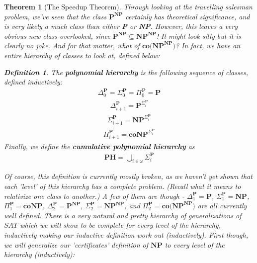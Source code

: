 \documentclass{article}
\theoremstyle{definition}
\newtheorem{definition}{Definition}[section]
\theoremstyle{plain}
\theoremstyle{theorem}
\newtheorem{theorem}{Theorem}[section]
\begin{document}
\begin{theorem}[The Speedup Theorem]
\par Through looking at the travelling salesman problem, we've seen that the class $\textbf{P}^{\textbf{NP}}$ certainly has theoretical significance, and is very likely a much class than either \textbf{P} or \textbf{NP}. However, this leaves a very obvious new class overlooked, since $\textbf{P}^{\textbf{NP}} \subseteq \textbf{NP}^{\textbf{NP}}$! It might look silly but it is clearly no joke. And for that matter, what of $\textbf{co(NP}^{\textbf{NP}})$? In fact, we have an entire hierarchy of classes to look at, defined below:
\begin{definition}
    The \textbf{polynomial hierarchy} is the following sequence of classes, defined inductively:
    \begin{align}
            \Delta_0^{\textbf{P}} = \Sigma_0^{\textbf{P}} = \Pi_0^{\textbf{P}} = \textbf{P}
    \end{align}
    \begin{align}
         \Delta_{i+1}^{\textbf{P}} = \textbf{P}^{\Sigma_i^{\textbf{P}}}
    \end{align}
    \begin{align}
        \Sigma_{i+1}^{\textbf{P}} = \textbf{NP}^{\Sigma_i^{\textbf{P}}}
    \end{align}
    \begin{align}
        \Pi_{i+1}^{\textbf{P}} = \textbf{coNP}^{\Sigma_i^{\textbf{P}}}
    \end{align}
    Finally, we define the \textbf{cumulative polynomial hierarchy} as 
    \begin{align}
        \textbf{PH} = \bigcup_{i \in \omega} \Sigma_i^{\textbf{P}}    
    \end{align}
\end{definition}
Of course, this definition is currently mostly broken, as we haven't yet shown that each 'level' of this hierarchy has a complete problem. (Recall what it means to relativize one class to another.) A few of them are though - $\Delta_1^{\textbf{P}} = \textbf{P}$, $\Sigma_1^{\textbf{P}} = \textbf{NP}$, $\Pi_1^{\textbf{P}} = \textbf{coNP}$, $\Delta_2^{\textbf{P}} = \textbf{P}^{\textbf{NP}}$, $\Sigma_2^{\textbf{P}} = \textbf{NP}^{\textbf{NP}}$, and $\Pi_2^{\textbf{P}} = \textbf{co(NP}^{\textbf{NP}})$ are all currently well defined. There is a very natural and pretty hierarchy of generalizations of $SAT$ which we will show to be complete for every level of the hierarchy, inductively making our inductive definition work out (inductively). First though, we will generalize our 'certificates' definition of $\textbf{NP}$ to every level of the hierarchy (inductively):

\end{theorem}
\end{document}
